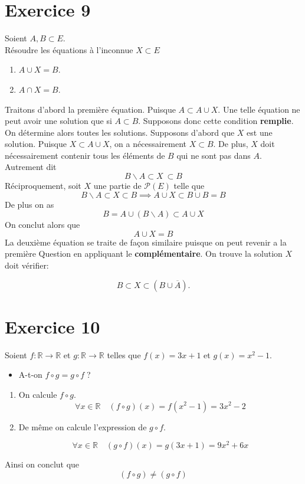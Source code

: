 \documentclass{report}
\begin{document}
\section{Exercice 9}
\qs{}
{
Soient $A, B \subset E$.\\
R\'esoudre les \'equations \`a l'inconnue $X \subset E$
\begin{enumerate}
\item $A \cup X = B$.
\item $A \cap X = B$.
\end{enumerate}
}
\begin{myproof}
 Traitons d'abord la première équation. Puisque $A\subset A\cup X$. Une telle
 équation ne peut avoir une solution que si $A\subset B$. Supposons donc cette
 condition \textbf{remplie}.\\
 On détermine alors toutes les solutions. Supposons d'abord que $X$ est une
 solution. Puisque $X\subset A\cup X$, on a nécessairement $X\subset B$. De
 plus, $X$ doit nécessairement contenir tous les éléments de $B$ qui ne sont pas
 dans $A$. Autrement dit
 $$
 B\backslash A \subset X \ \subset B
 $$
 Réciproquement, soit $X$ une partie de $\mathcal{P}(E)$ telle que 
 $$
 B\backslash A \subset X \subset B \implies A\cup X \subset B\cup B = B
 $$
 De plus on as 
 $$
 B = A \cup(B\backslash A) \subset A\cup X
 $$
 On conclut alors que 
 $$
 A \cup X = B
 $$
 La deuxième équation se traite de façon similaire puisque on peut revenir a la
 première Question en appliquant le \textbf{complémentaire}.
 On trouve la solution $X$ doit vérifier:

 $$
 B \subset X \subset (B\cup \overline{A}).
 $$
\end{myproof}


\section{Exercice 10}
{
  Soient $f : \mathbb{R} \rightarrow \mathbb{R}$ et $g : \mathbb{R} \rightarrow
  \mathbb{R}$ telles que $f(x) =
3x+1$ et $g(x)=x^2-1$.
\begin{itemize}
  \item  A-t-on $f\circ g=g\circ f\;$?
\end{itemize}

}
\begin{myproof}
  \begin{enumerate}
\item On calcule $f\circ g$. 
  $$
  \forall x \in \mathbb{R}\quad \left(f\circ g\right)(x) = f(x^2 -1) = 3x^2 -2
  $$
\item  De même on calcule l'expression de $g\circ f$.

  $$
  \forall x \in \mathbb{R}\quad \left(g\circ f\right)(x) = g(3x+1) = 9x^2 + 6x
  $$
  \end{enumerate}
  Ainsi on conclut que 
  $$
  \left(f \circ g \right) \neq \left(g \circ f\right)
  $$
\end{myproof}
\end{document}
